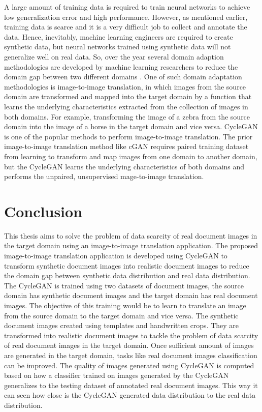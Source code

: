 A large amount of training data is required to train neural networks to achieve low generalization error and high performance. However, as mentioned earlier, training data is scarce and it is a very difficult job to collect and annotate the data. Hence, inevitably, machine learning engineers are required to create synthetic data, but neural networks trained using synthetic data will not generalize well on real data. So, over the year several domain adaption methodologies are developed by machine learning researchers to reduce the domain gap between two different domains \cite{farahani2020brief}. One of such domain adaptation methodologies is image-to-image translation, in which images from the source domain are transformed and mapped into the target domain by a function that learns the underlying characteristics extracted from the collection of images in both domains. For example, transforming the image of a zebra from the source domain into the image of a horse in the target domain and vice versa. \ac{CycleGAN} is one of the popular methods to perform image-to-image translation. The prior image-to-image translation method like \ac{cGAN} requires paired training dataset from learning to transform and map images from one domain to another domain, but the \ac{CycleGAN} learns the underlying characteristics of both domains and performs the unpaired, unsupervised mage-to-image translation.


\section{Conclusion}\label{Conclusion}

This thesis aims to solve the problem of data scarcity of real document images in the target domain using an image-to-image translation application. The proposed image-to-image translation application is developed using \ac{CycleGAN} to transform synthetic document images into realistic document images to reduce the domain gap between synthetic data distribution and real data distribution. The \ac{CycleGAN} is trained using two datasets of document images, the source domain has synthetic document images and the target domain has real document images. The objective of this training would be to learn to translate an image from the source domain to the target domain and vice versa. The synthetic document images created using templates and handwritten crops. They are transformed into realistic document images to tackle the problem of data scarcity of real document images in the target domain. Once sufficient amount of images are generated in the target domain, tasks like real document images classification can be improved. The quality of images generated using \ac{CycleGAN} is computed based on how a classifier trained on images generated by the \ac{CycleGAN} generalizes to the testing dataset of annotated real document images. This way it can seen how close is the \ac{CycleGAN} generated data distribution to the real data distribution.

